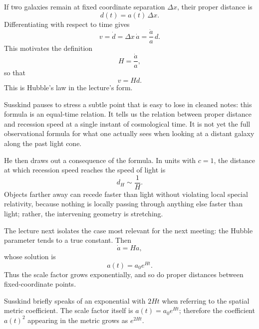 If two galaxies remain at fixed coordinate separation \(\Delta x\), their proper distance is
\begin{equation}
d(t)=a(t)\,\Delta x.
\end{equation}
Differentiating with respect to time gives
\begin{equation}
v=\dot d=\Delta x\,\dot a=\frac{\dot a}{a}\,d.
\end{equation}
This motivates the definition
\begin{equation}
H=\frac{\dot a}{a},
\end{equation}
so that
\begin{equation}
v=Hd.
\end{equation}
This is Hubble's law in the lecture's form.

Susskind pauses to stress a subtle point that is easy to lose in cleaned notes: this formula is an equal-time relation. It tells us the relation between proper distance and recession speed at a single instant of cosmological time. It is not yet the full observational formula for what one actually sees when looking at a distant galaxy along the past light cone.

He then draws out a consequence of the formula. In units with \(c=1\), the distance at which recession speed reaches the speed of light is
\begin{equation}
d_H \sim \frac{1}{H}.
\end{equation}
Objects farther away can recede faster than light without violating local special relativity, because nothing is locally passing through anything else faster than light; rather, the intervening geometry is stretching.

The lecture next isolates the case most relevant for the next meeting: the Hubble parameter tends to a true constant. Then
\begin{equation}
\dot a = Ha,
\end{equation}
whose solution is
\begin{equation}
a(t)=a_0 e^{Ht}.
\end{equation}
Thus the scale factor grows exponentially, and so do proper distances between fixed-coordinate points.

\begin{remark}
Susskind briefly speaks of an exponential with \(2Ht\) when referring to the spatial metric coefficient. The scale factor itself is \(a(t)=a_0e^{Ht}\); therefore the coefficient \(a(t)^2\) appearing in the metric grows as \(e^{2Ht}\).
\end{remark}

